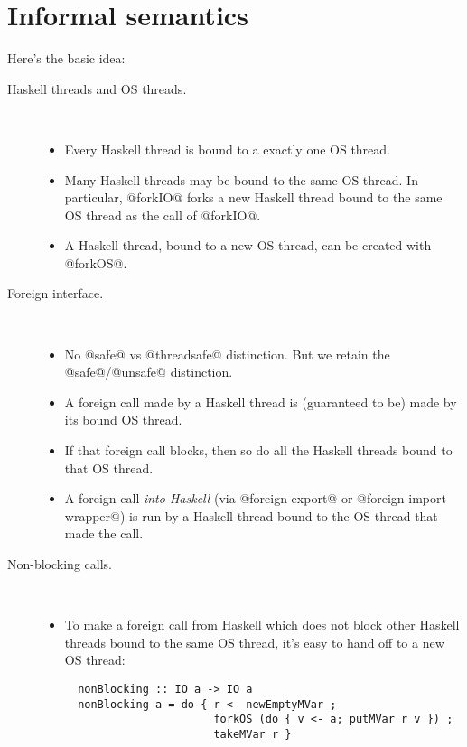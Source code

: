\documentclass{article}
\begin{document}
\section{Informal semantics}

Here's the basic idea:
\begin{description}
\item[Haskell threads and OS threads.] \mbox{}\\
\begin{itemize}
\item Every Haskell thread is bound to a exactly one OS thread.  

\item Many Haskell threads 
may be bound to the same OS thread.
In particular, @forkIO@ forks a new Haskell thread bound to the same OS thread as the call of @forkIO@.

\item A Haskell thread, bound to a new OS thread, can be created with @forkOS@.

\end{itemize}

\item[Foreign interface.] \mbox{}\\
\begin{itemize}
\item No @safe@ vs @threadsafe@ distinction. But we retain the @safe@/@unsafe@ distinction.
\item A foreign call made by a Haskell thread is (guaranteed to be) made by its bound OS thread.
\item If that foreign call blocks, then so do all the Haskell threads bound to that OS thread.
\item A foreign call \emph{into Haskell} (via @foreign export@ or @foreign import wrapper@) is 
run by a Haskell thread bound to the OS thread that made the call.
\end{itemize}

\item[Non-blocking calls.] \mbox{}\\
\begin{itemize}
\item 
To make a foreign call from Haskell which does not block other Haskell threads bound to the
same OS thread, it's easy to hand off to a new OS thread:
\begin{verbatim}
  nonBlocking :: IO a -> IO a
  nonBlocking a = do { r <- newEmptyMVar ;
                       forkOS (do { v <- a; putMVar r v }) ;
                       takeMVar r }


\end{verbatim}
\end{itemize}
\end{description}
\end{document}
